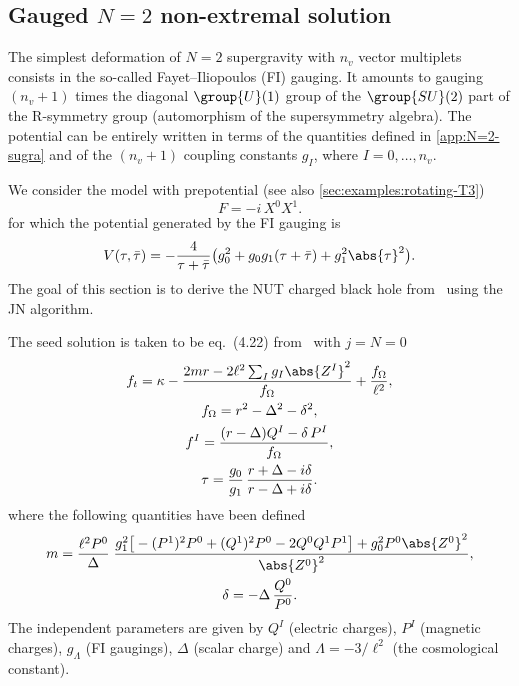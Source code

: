 \subsection{Gauged \texorpdfstring{$N = 2$}{N = 2} non-extremal solution}
\label{sec:examples:gauged-N=2}


The simplest deformation of $N = 2$ supergravity with $n_v$ vector multiplets consists in the so-called Fayet--Iliopoulos (FI) gauging.
It amounts to gauging $(n_v + 1)$ times the diagonal $\group{U}(1)$ group of the $\group{SU}(2)$ part of the R-symmetry group (automorphism of the supersymmetry algebra).
The potential can be entirely written in terms of the quantities defined in \cref{app:N=2-sugra} and of the $(n_v + 1)$ coupling constants $g_I$, where $I = 0, \ldots, n_v$.

We consider the model with prepotential (see also \cref{sec:examples:rotating-T3})
\begin{equation}
	F = - i\, X^0 X^1.
\end{equation} 
for which the potential generated by the FI gauging is
\begin{equation}
	V(\tau, \bar \tau) = - \frac{4}{\tau + \bar \tau} \big(g_0^2 + g_0 g_1 (\tau + \bar\tau) + g_1^2 \abs{\tau}^2 \big).
\end{equation} 
The goal of this section is to derive the NUT charged black hole from~\cite{Gnecchi:2014:RotatingBlackHoles} using the JN algorithm.\footnotemark{}%

The seed solution is taken to be eq.\ (4.22) from~\cite{Gnecchi:2014:RotatingBlackHoles} with $j = N = 0$
\begin{subequations}
\begin{gather}
	f_t = \kappa
		- \frac{2 m r - 2 \ell^2 \sum_I g_I \abs{Z^I}^2}{f_\Omega}
		+ \frac{f_\Omega}{\ell^2}, \\
	f_\Omega = r^2 - \Delta^2 - \delta^2, \\
	f^I = \frac{(r - \Delta) Q^I - \delta\, P^I}{f_\Omega}, \\
	\tau = \frac{g_0}{g_1}\, \frac{r + \Delta - i \delta}{r - \Delta + i \delta}.
\end{gather}
\end{subequations}
where the following quantities have been defined
\begin{subequations}
\begin{gather}
	m = \frac{\ell^2 P^0}{\Delta}\; \frac{g_1^2 \big[- (P^1)^2 P^0 + (Q^1)^2 P^0 - 2 Q^0 Q^1 P^1 \big] + g_0^2 P^0 \abs{Z^0}^2}{\abs{Z^0}^2}, \\
	\delta = - \Delta\, \frac{Q^0}{P^0}.
\end{gather}
\end{subequations}
The independent parameters are given by $Q^I$ (electric charges), $P^I$ (magnetic charges), $g_\Lambda$ (FI gaugings), $\Delta$ (scalar charge) and $\Lambda = - 3 / \ell^2$ (the cosmological constant).

